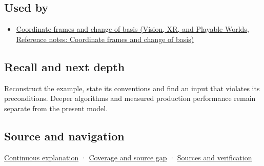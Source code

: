 \subsection{Used by}\label{appendix-48d2e66378ab-used-by}

\hypertarget{appendix-48d2e66378ab-used-by}{}

\begin{itemize}
\tightlist
\item
  \href{../07-Vision-XR-and-Playable-Worlds/main.pdf\#nameddest=appendix-1bae9457dbc3}{Coordinate frames and change of basis (Vision, XR, and Playable Worlds, Reference notes: Coordinate frames and change of basis)}
\end{itemize}

\subsection{Recall and next depth}\label{appendix-48d2e66378ab-recall-and-next-depth}

\hypertarget{appendix-48d2e66378ab-recall-and-next-depth}{}

Reconstruct the example, state its conventions and find an input that violates its preconditions. Deeper algorithms and measured production performance remain separate from the present model.

\subsection{Source and navigation}\label{appendix-48d2e66378ab-source-and-navigation}

\hypertarget{appendix-48d2e66378ab-source-and-navigation}{}

\hyperref[01-foundations-i-ch018-keep-the-promises-visible-while-moving-between-representations]{Continuous explanation} · \hyperref[appendix-fd090d982a15-phase-7---parts-601-700]{Coverage and source gap} · \hyperref[appendix-a103e7846d21-phase-7---source-analysis-and-verification]{Sources and verification}
